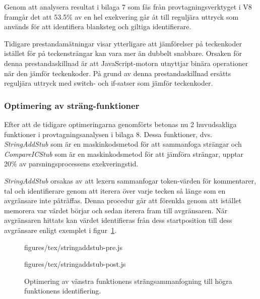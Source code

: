 Genom att analysera resultat i bilaga 7 som fås från provtagningsverktyget i
V8 framgår det att 53.5\% av en hel exekvering går åt till reguljära uttryck
som används för att identifiera blanksteg och giltiga identifierare.

Tidigare prestandamätningar \citep{charcodeat} visar ytterligare att
jämförelser på teckenkoder istället för på teckensträngar kan vara mer än dubbelt
snabbare. Orsaken för denna prestandaskillnad är att JavaScript-motorn
utnyttjar binära operationer när den jämför teckenkoder. På grund av denna
prestandaskillnad ersätts reguljära uttryck med switch- och if-satser som
jämför teckenkoder.

\subsubsection{Optimering av sträng-funktioner}

Efter att de tidigare optimeringarna genomförts betonas nu 2 huvudsakliga
funktioner i provtagningsanalysen i bilaga 8. Dessa funktioner, dvs.
\textit{StringAddStub} som är en maskinkodsmetod för att sammanfoga strängar
och \textit{CompareICStub} som är en maskinkodsmetod för att jämföra strängar,
upptar 20\% av parsningsprocessens exekveringstid.

\textit{StringAddStub} orsakas av att lexern sammanfogar token-värden för
kommentarer, tal och identifierare genom att iterera över varje tecken så
länge som en avgränsare inte påträffas. Denna procedur går att förenkla genom
att istället memorera var värdet börjar och sedan iterera fram till
avgränsaren. När avgränsaren hittats kan värdet identifieras från dess
startposition till dess avgränsare enligt exemplet i figur~\ref{fig:stringAddStub}.

\begin{figure}[ht]
  \begin{minipage}[t]{0.5\textwidth}
      {figures/tex/stringaddstub-pre.js}
  \end{minipage}%
  \begin{minipage}[t]{0.5\textwidth}
      {figures/tex/stringaddstub-post.js}
  \end{minipage}
  \caption{Optimering av vänstra funktionens strängsammanfogning till högra
    funktionens identifiering.}
  \label{fig:stringAddStub}
\end{figure}

